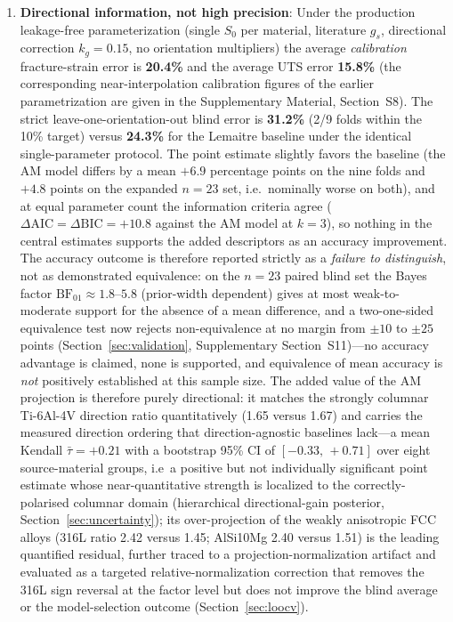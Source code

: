 \documentclass[twocolumn]{sagej}
\begin{document}
\begin{enumerate}
    \item \textbf{Directional information, not high precision}: Under the production leakage-free parameterization (single $S_0$ per material, literature $g_s$, directional correction $k_g = 0.15$, no orientation multipliers) the average \emph{calibration} fracture-strain error is \textbf{20.4\%} and the average UTS error \textbf{15.8\%} (the corresponding near-interpolation calibration figures of the earlier parametrization are given in the Supplementary Material, Section~S8). The strict leave-one-orientation-out blind error is \textbf{31.2\%} (2/9 folds within the 10\% target) versus \textbf{24.3\%} for the Lemaitre baseline under the identical single-parameter protocol. The point estimate slightly favors the baseline (the AM model differs by a mean $+6.9$ percentage points on the nine folds and $+4.8$ points on the expanded $n=23$ set, i.e.\ nominally worse on both), and at equal parameter count the information criteria agree ($\Delta\mathrm{AIC} = \Delta\mathrm{BIC} = +10.8$ against the AM model at $k=3$), so nothing in the central estimates supports the added descriptors as an accuracy improvement. The accuracy outcome is therefore reported strictly as a \emph{failure to distinguish}, not as demonstrated equivalence: on the $n=23$ paired blind set the Bayes factor $\mathrm{BF}_{01}\approx1.8$--$5.8$ (prior-width dependent) gives at most weak-to-moderate support for the absence of a mean difference, and a two-one-sided equivalence test now rejects non-equivalence at no margin from $\pm10$ to $\pm25$ points (Section~\ref{sec:validation}, Supplementary Section~S11)---no accuracy advantage is claimed, none is supported, and equivalence of mean accuracy is \emph{not} positively established at this sample size. The added value of the AM projection is therefore purely directional: it matches the strongly columnar Ti-6Al-4V direction ratio quantitatively (1.65 versus 1.67) and carries the measured direction ordering that direction-agnostic baselines lack---a mean Kendall $\bar\tau = +0.21$ with a bootstrap 95\% CI of $[-0.33,\,+0.71]$ over eight source-material groups, i.e\ a positive but not individually significant point estimate whose near-quantitative strength is localized to the correctly-polarised columnar domain (hierarchical directional-gain posterior, Section~\ref{sec:uncertainty}); its over-projection of the weakly anisotropic FCC alloys (316L ratio 2.42 versus 1.45; AlSi10Mg 2.40 versus 1.51) is the leading quantified residual, further traced to a projection-normalization artifact and evaluated as a targeted relative-normalization correction that removes the 316L sign reversal at the factor level but does not improve the blind average or the model-selection outcome (Section~\ref{sec:loocv}).
    

\end{enumerate}
\end{document}
